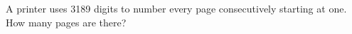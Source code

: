 A printer uses 3189 digits to number every page consecutively starting at one. How many pages are there?
